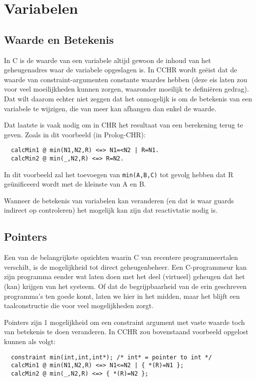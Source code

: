 \section{Variabelen}

\subsection{Waarde en Betekenis}

In C is de waarde van een variabele altijd gewoon de inhoud van het geheugenadres waar de variabele opgeslagen is. In CCHR
wordt ge\"eist dat de waarde van constraint-argumenten constante waardes hebben (deze eis laten zou voor veel moeilijkheden
kunnen zorgen, waaronder moeilijk te defini\"eren gedrag). Dat wilt daarom echter niet zeggen dat het onmogelijk is om de
betekenis van een variabele te wijzigen, die van meer kan afhangen dan enkel de waarde.

Dat laatste is vaak nodig om in CHR het resultaat van een berekening terug te geven. Zoals in dit voorbeeld (in Prolog-CHR): \begin{Verbatim}
  calcMin1 @ min(N1,N2,R) <=> N1=<N2 | R=N1.
  calcMin2 @ min(_,N2,R) <=> R=N2.
\end{Verbatim}
In dit voorbeeld zal het toevoegen van {\tt min(A,B,C)} tot gevolg hebben dat R ge\"unificeerd wordt met de kleinste van A en B.

Wanneer de betekenis van variabelen kan veranderen (en dat is waar guards indirect op controleren) het mogelijk kan zijn dat
reactivtatie nodig is.

\subsection{Pointers}

Een van de belangrijkste opzichten waarin C van recentere programmeertalen verschilt, is de mogelijkheid tot direct
geheugenbeheer. Een C-programmeur kan zijn programma eender wat laten doen met het deel (virtueel) geheugen dat het (kan)
krijgen van het systeem. Of dat de begrijpbaarheid van de erin geschreven programma's ten goede komt, laten we hier in het
midden, maar het blijft een taalconstructie die voor veel mogelijkheden zorgt.

Pointers zijn 1 mogelijkheid om een constraint argument met vaste waarde toch van betekenis te doen veranderen. In CCHR
zou bovenstaand voorbeeld opgelost kunnen als volgt: \begin{Verbatim}
  constraint min(int,int,int*); /* int* = pointer to int */
  calcMin1 @ min(N1,N2,R) <=> N1<=N2 | { *(R)=N1 };
  calcMin2 @ min(_,N2,R) <=> { *(R)=N2 };
\end{Verbatim}

